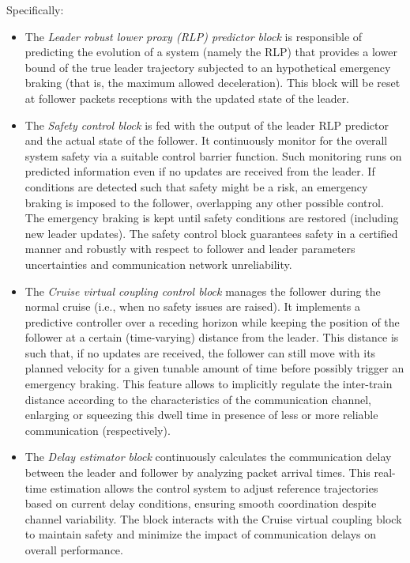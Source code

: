 \documentclass[letterpaper, 10 pt, conference]{ieeeconf}
\theoremstyle{definition}
\theoremstyle{nopoint}
\begin{document}
Specifically:
\begin{itemize}
\item The {\em Leader robust lower proxy (RLP) predictor block} is responsible of predicting the evolution of a system (namely the RLP) that provides a lower bound of the true leader trajectory subjected to an hypothetical emergency braking (that is, the maximum allowed deceleration). 
This block will be reset at follower packets receptions with the updated state of the leader. 
\item The {\em Safety control block} is fed with the output of the leader RLP predictor and the actual state of the follower. It continuously monitor for the overall system safety via a suitable control barrier function. Such monitoring runs on predicted information even if no updates are received from the leader. If conditions are detected such that safety might be a risk, an emergency braking is imposed to the follower, overlapping any other possible control. The emergency braking is kept until safety conditions are restored (including new leader updates). The safety control block guarantees safety in a certified manner and robustly with respect to follower and leader parameters uncertainties and communication network unreliability. 
\item The {\em Cruise virtual coupling control block} manages the follower during the normal cruise (i.e., when no safety issues are raised). It implements a predictive controller over a receding horizon while keeping the position of the follower at a certain (time-varying) distance from the leader. This distance is such that, if no updates are received, the follower can still move with its planned velocity for a given tunable amount of time before possibly trigger an emergency braking. 
This feature allows to implicitly regulate the inter-train distance according to the characteristics of the communication channel, enlarging or squeezing this dwell time in presence of less or more reliable communication (respectively). 
\item The {\em  Delay estimator block} continuously calculates the communication delay between the leader and follower by analyzing packet arrival times. This real-time estimation allows the control system to adjust reference trajectories based on current delay conditions, ensuring smooth coordination despite channel variability. The block interacts with the Cruise virtual coupling block to maintain safety and minimize the impact of communication delays on overall performance.
\end{itemize} 
\end{document}
